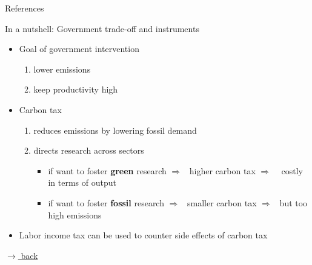 \documentclass[11pt,aspectratio=169]{beamer}
\newcommand{\ar}{$\Rightarrow$ \ }
\begin{document}


\begin{frame}[shrink]{References}
	
	
	
\end{frame}



\appendix

%




\begin{frame}{In a nutshell: Government trade-off and instruments}
	\hypertarget{govProb}{}
	\begin{itemize}
		\item 	Goal of government intervention
		\begin{enumerate}
			\item[a)] lower emissions
			\item[b)] keep productivity high
		\end{enumerate}
		\vspace{3mm}
		\item Carbon tax
		\begin{enumerate}
			\item[a)] reduces emissions by lowering fossil demand
			\item[b)] directs research across sectors
			\begin{itemize}
				\item[-] if want to foster \textbf{green} research
				\ar higher carbon tax \ar %
				costly in terms of output %
				\item[-] if want to foster \textbf{fossil} research \ar smaller carbon tax \ar but too high emissions
			\end{itemize}
		\end{enumerate}
		\item Labor income tax can be used to counter side effects of carbon tax 
	\end{itemize}
	
	\vspace{5mm}
	\hfill	\hyperlink{calback}{\tiny{$\rightarrow$ back}}
\end{frame}
\end{document}
